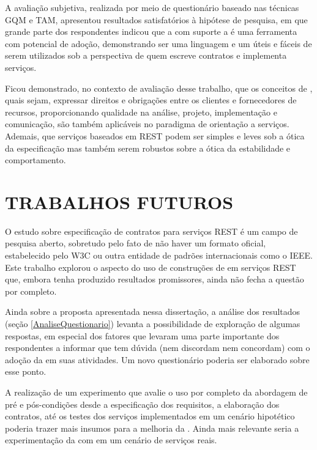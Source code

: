 A avaliação subjetiva, realizada por meio de questionário baseado nas técnicas GQM e TAM, apresentou
resultados satisfatórios à hipótese de pesquisa, em que grande parte dos respondentes indicou que a \neoidl{} com suporte
a \designbycontract{} é uma ferramenta com potencial de adoção, demonstrando ser uma linguagem e um 
\framework{} úteis e fáceis de serem utilizados sob a perspectiva de quem escreve contratos e implementa
serviços. 

Ficou demonstrado, no contexto de avaliação desse trabalho, que os conceitos de \designbycontract, quais sejam,
expressar direitos e obrigações entre os clientes e fornecedores de recursos, proporcionando qualidade na
análise, projeto, implementação e comunicação, são também aplicáveis no paradigma de orientação
a serviços. Ademais, que serviços baseados em \wss REST podem ser simples e leves sob a ótica
da especificação mas também serem robustos sobre a ótica da estabilidade e comportamento.


\section{TRABALHOS FUTUROS}
\vspace{-6mm}

O estudo sobre especificação de contratos para serviços REST é um campo de
pesquisa aberto, sobretudo pelo fato de não haver um formato oficial,
estabelecido pelo W3C ou outra entidade de padrões internacionais como o IEEE.
Este trabalho explorou o aspecto do uso de construções de \designbycontract{}
em serviços REST que, embora tenha produzido resultados promissores, ainda não
fecha a questão por completo.

Ainda sobre a proposta apresentada nessa dissertação, a análise dos resultados
(seção \ref{AnaliseQuestionario}) levanta a possibilidade de exploração de
algumas respostas, em especial dos fatores que levaram uma parte importante dos
respondentes a informar que tem dúvida (nem discordam nem concordam) com o
adoção da \neoidl{} em suas atividades. Um novo questionário poderia ser
elaborado sobre esse ponto.

A realização de um experimento que avalie o uso por completo da abordagem de
pré e pós-condições desde a especificação dos requisitos, a elaboração dos
contratos, até os testes dos serviços implementados em um cenário hipotético
poderia trazer mais insumos para a melhoria da \neoidl{}. Ainda mais relevante
seria a experimentação da \neoidl{} com \designbycontract{} em um cenário de serviços reais.

